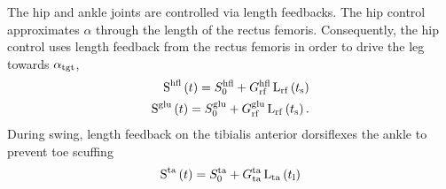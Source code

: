 The hip and ankle joints are controlled via length feedbacks. The hip control
approximates $\alpha$ through the length of the rectus femoris. Consequently,
the hip control uses length feedback from the rectus femoris in order to drive
the leg towards $\alpha_{\mathrm{tgt}}$,
\begin{align}
    \func{S}[][\tn{hfl}]{t} = S_0^\tn{hfl} + G_\tn{rf}^\tn{hfl}
        \func{L}[\tn{rf}]{t_\tn{s}} \\
    \func{S}[][\tn{glu}]{t} = S_0^\tn{glu} + G_\tn{rf}^\tn{glu}
        \func{L}[\tn{rf}]{t_\tn{s}}.
\end{align}
During swing, length feedback on the tibialis anterior dorsiflexes the ankle to
prevent toe scuffing
\begin{align}
    \func{S}[][\tn{ta}]{t} = S_0^\tn{ta} + G_\tn{ta}^\tn{ta}
        \func{L}[\tn{ta}]{t_\tn{l}}
\end{align}
